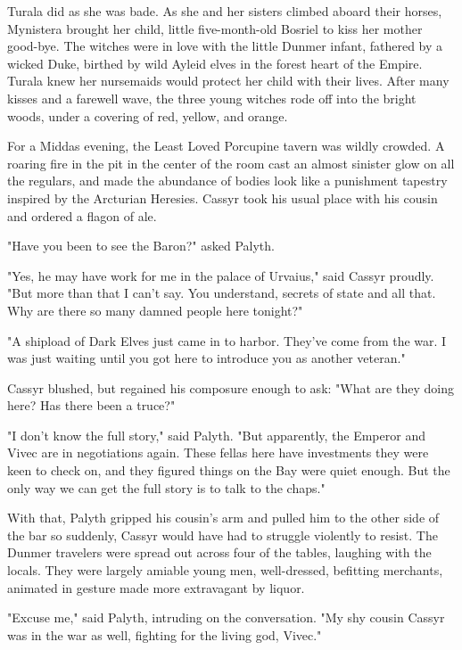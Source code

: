 Turala did as she was bade. As she and her sisters climbed aboard their horses, Mynistera brought her child, little five-month-old Bosriel to kiss her mother good-bye. The witches were in love with the little Dunmer infant, fathered by a wicked Duke, birthed by wild Ayleid elves in the forest heart of the Empire. Turala knew her nursemaids would protect her child with their lives. After many kisses and a farewell wave, the three young witches rode off into the bright woods, under a covering of red, yellow, and orange.

For a Middas evening, the Least Loved Porcupine tavern was wildly crowded. A roaring fire in the pit in the center of the room cast an almost sinister glow on all the regulars, and made the abundance of bodies look like a punishment tapestry inspired by the Arcturian Heresies. Cassyr took his usual place with his cousin and ordered a flagon of ale.

"Have you been to see the Baron?" asked Palyth.

"Yes, he may have work for me in the palace of Urvaius," said Cassyr proudly. "But more than that I can't say. You understand, secrets of state and all that. Why are there so many damned people here tonight?"

"A shipload of Dark Elves just came in to harbor. They've come from the war. I was just waiting until you got here to introduce you as another veteran."

Cassyr blushed, but regained his composure enough to ask: "What are they doing here? Has there been a truce?"

"I don't know the full story," said Palyth. "But apparently, the Emperor and Vivec are in negotiations again. These fellas here have investments they were keen to check on, and they figured things on the Bay were quiet enough. But the only way we can get the full story is to talk to the chaps."

With that, Palyth gripped his cousin's arm and pulled him to the other side of the bar so suddenly, Cassyr would have had to struggle violently to resist. The Dunmer travelers were spread out across four of the tables, laughing with the locals. They were largely amiable young men, well-dressed, befitting merchants, animated in gesture made more extravagant by liquor.

"Excuse me," said Palyth, intruding on the conversation. "My shy cousin Cassyr was in the war as well, fighting for the living god, Vivec."

